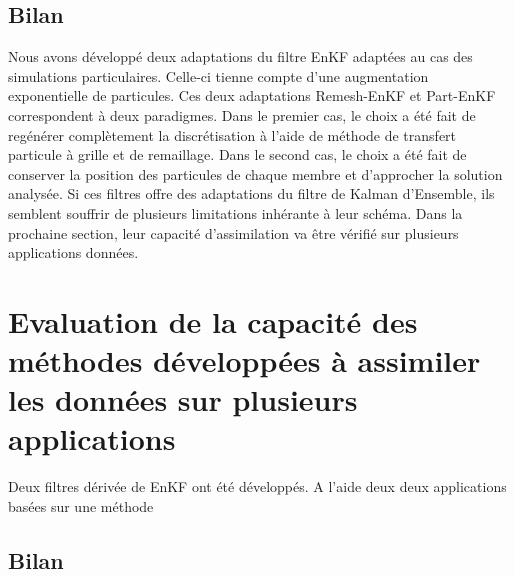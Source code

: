 \subsection{Bilan}

Nous avons développé deux adaptations du filtre EnKF adaptées au cas des simulations particulaires. Celle-ci tienne compte d'une augmentation exponentielle de particules.
Ces deux adaptations Remesh-EnKF et Part-EnKF correspondent à deux paradigmes. Dans le premier cas, le choix a été fait de regénérer complètement la discrétisation à l'aide de méthode de transfert particule à grille et de remaillage. Dans le second cas, le choix a été fait de conserver la position des particules de chaque membre et d'approcher la solution analysée.
Si ces filtres offre des adaptations du filtre de Kalman d'Ensemble, ils semblent souffrir de plusieurs limitations inhérante à leur schéma. Dans la prochaine section, leur capacité d'assimilation va être vérifié sur plusieurs applications données.

\section{Evaluation de la capacité des méthodes développées à assimiler les données sur plusieurs applications}

Deux filtres dérivée de EnKF ont été développés. A l'aide deux deux applications basées sur une méthode


\subsection{Bilan}